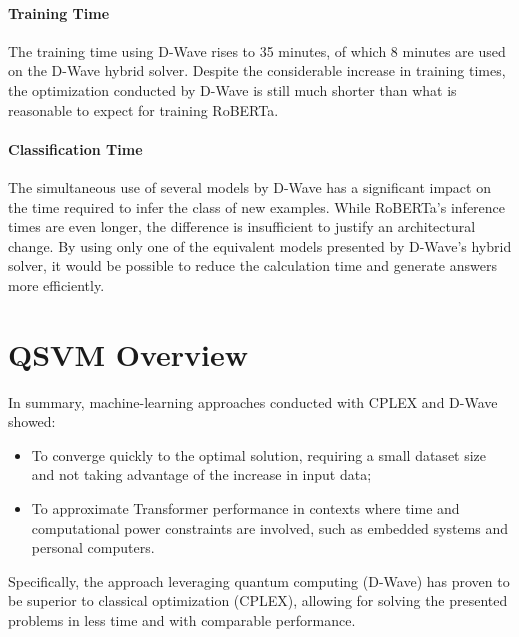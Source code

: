 \paragraph{Training Time} The training time using D-Wave rises to 35 minutes, of which 8 minutes are used on the D-Wave hybrid solver. 
Despite the considerable increase in training times, the optimization conducted by D-Wave is still much shorter than what is reasonable to expect for training RoBERTa.

\paragraph{Classification Time} The simultaneous use of several models by D-Wave has a significant impact on the time required to infer the class of new examples. While RoBERTa's inference times are even longer, the difference is insufficient to justify an architectural change. By using only one of the equivalent models presented by D-Wave's hybrid solver, it would be possible to reduce the calculation time and generate answers more efficiently.

\section{QSVM Overview}

In summary, machine-learning approaches conducted with CPLEX and D-Wave showed:
\begin{itemize}
    \item To converge quickly to the optimal solution, requiring a small dataset size and not taking advantage of the increase in input data;
    \item To approximate Transformer performance in contexts where time and computational power constraints are involved, such as embedded systems and personal computers.
\end{itemize}

Specifically, the approach leveraging quantum computing (D-Wave) has proven to be superior to classical optimization (CPLEX), allowing for solving the presented problems in less time and with comparable performance.
